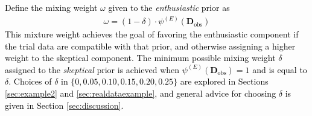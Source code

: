 \documentclass[12pt]{article}
\begin{document}
\textcolor{black}{
Define the mixing weight $\omega$ given to the \textit{enthusiastic} prior as
\begin{align}\label{eq:omega}
\omega= (1 - \delta)\cdot\psi^{(E)}(\mathbf{D}_{\text{obs}})
\end{align}
This mixture weight achieves the goal of favoring the enthusiastic component if the trial data are compatible with that prior, and otherwise assigning a higher weight to the skeptical component. The minimum possible mixing weight $\delta$ assigned to the \textit{skeptical} prior is achieved when $\psi^{(E)}(\mathbf{D}_{\text{obs}})=1$ and is equal to $\delta$. Choices of $\delta$ in $\{0, 0.05, 0.10, 0.15, 0.20, 0.25\}$ are explored in Sections \ref{sec:example2} and \ref{sec:realdataexample}, and general advice for choosing $\delta$ is given in Section \ref{sec:discussion}.}
%
%
\end{document}
